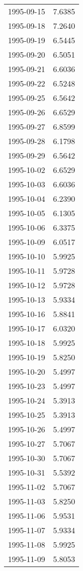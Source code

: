 \begin{tabular}{lr}
1995-09-15 &      7.6385 \\
1995-09-18 &      7.2640 \\
1995-09-19 &      6.5445 \\
1995-09-20 &      6.5051 \\
1995-09-21 &      6.6036 \\
1995-09-22 &      6.5248 \\
1995-09-25 &      6.5642 \\
1995-09-26 &      6.6529 \\
1995-09-27 &      6.8599 \\
1995-09-28 &      6.1798 \\
1995-09-29 &      6.5642 \\
1995-10-02 &      6.6529 \\
1995-10-03 &      6.6036 \\
1995-10-04 &      6.2390 \\
1995-10-05 &      6.1305 \\
1995-10-06 &      6.3375 \\
1995-10-09 &      6.0517 \\
1995-10-10 &      5.9925 \\
1995-10-11 &      5.9728 \\
1995-10-12 &      5.9728 \\
1995-10-13 &      5.9334 \\
1995-10-16 &      5.8841 \\
1995-10-17 &      6.0320 \\
1995-10-18 &      5.9925 \\
1995-10-19 &      5.8250 \\
1995-10-20 &      5.4997 \\
1995-10-23 &      5.4997 \\
1995-10-24 &      5.3913 \\
1995-10-25 &      5.3913 \\
1995-10-26 &      5.4997 \\
1995-10-27 &      5.7067 \\
1995-10-30 &      5.7067 \\
1995-10-31 &      5.5392 \\
1995-11-02 &      5.7067 \\
1995-11-03 &      5.8250 \\
1995-11-06 &      5.9531 \\
1995-11-07 &      5.9334 \\
1995-11-08 &      5.9925 \\
1995-11-09 &      5.8053 \\

\end{tabular}
